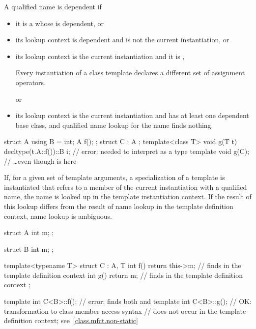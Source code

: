 \pnum
A qualified name is dependent if
\begin{itemize}
\item
it is a 
whose  is dependent, or
\item
its lookup context is dependent and is not the current instantiation, or
\item
its lookup context is the current instantiation and
it is ,
\begin{footnote}
Every instantiation of a class template declares
a different set of assignment operators.
\end{footnote}
or
\item
its lookup context is the current instantiation and
has at least one dependent base class, and
qualified name lookup for the name finds nothing.
\end{itemize}
\begin{example}
\begin{codeblock}
struct A {
  using B = int;
  A f();
};
struct C : A {};
template<class T>
void g(T t) {
  decltype(t.A::f())::B i;      // error:  needed to interpret  as a type
}
template void g(C);             // \ldots even though  is  here
\end{codeblock}
\end{example}

\pnum
If, for a given set of template arguments, a specialization of a template is
instantiated that refers to a member of the current instantiation with a
qualified name, the name is looked up in the
template instantiation context. If the result of this lookup differs from the
result of name lookup in the template definition context, name lookup is
ambiguous.
\begin{example}
\begin{codeblock}
struct A {
  int m;
};

struct B {
  int m;
};

template<typename T>
struct C : A, T {
  int f() { return this->m; }   // finds  in the template definition context
  int g() { return m; }         // finds  in the template definition context
};

template int C<B>::f();     // error: finds both  and 
template int C<B>::g();     // OK: transformation to class member access syntax
                            // does not occur in the template definition context; see~\ref{class.mfct.non-static}
\end{codeblock}
\end{example}

